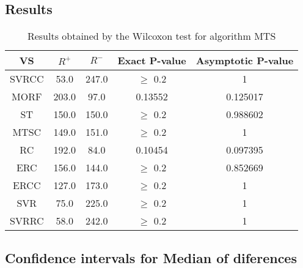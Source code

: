 \documentclass[a4paper,10pt]{article}
\begin{document}
\subsection{Results}

\begin{table}[!htp]
\centering\small
\begin{tabular}{
|c|c|c|c|c|}
\hline
 VS & $R^{+}$ & $R^{-}$ & Exact P-value & Asymptotic P-value \\ \hline 
SVRCC & 53.0 & 247.0 & $\geq$ 0.2 & 1\\ \hline 
MORF & 203.0 & 97.0 & 0.13552 & 0.125017\\ \hline 
ST & 150.0 & 150.0 & $\geq$ 0.2 & 0.988602\\ \hline 
MTSC & 149.0 & 151.0 & $\geq$ 0.2 & 1\\ \hline 
RC & 192.0 & 84.0 & 0.10454 & 0.097395\\ \hline 
ERC & 156.0 & 144.0 & $\geq$ 0.2 & 0.852669\\ \hline 
ERCC & 127.0 & 173.0 & $\geq$ 0.2 & 1\\ \hline 
SVR & 75.0 & 225.0 & $\geq$ 0.2 & 1\\ \hline 
SVRRC & 58.0 & 242.0 & $\geq$ 0.2 & 1\\ \hline 

\end{tabular}
\caption{Results obtained by the Wilcoxon test for algorithm MTS}
\end{table}

\subsection{Confidence intervals for Median of diferences}
\end{document}
